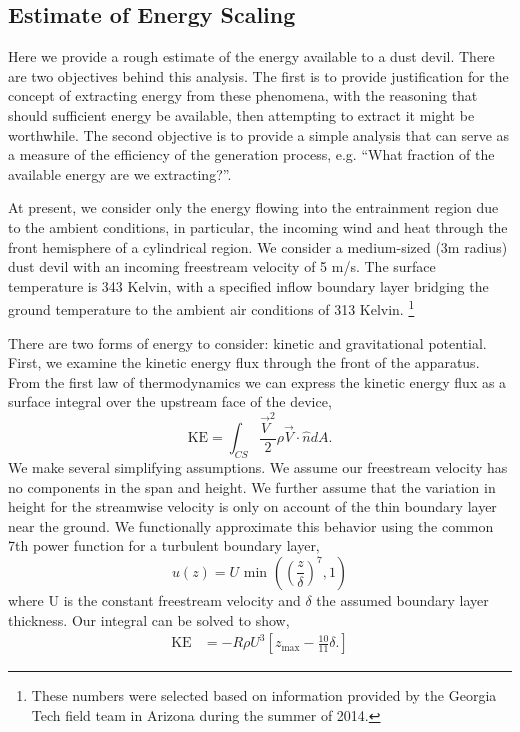 \subsection{Estimate of Energy Scaling}

Here we provide a rough estimate of the energy
available to a dust devil. There are two objectives behind this
analysis. The first is to provide justification for the concept of
extracting energy from these phenomena, with the reasoning that should
sufficient energy be available, then attempting to extract it might be
worthwhile. The second objective is to provide a simple analysis that
can serve as a measure of the efficiency of the generation process,
e.g. ``What fraction of the available energy are we extracting?''.  

At present, we consider only the energy flowing into the entrainment
region due to the ambient conditions, in particular, the incoming wind
and heat through the front hemisphere of a cylindrical region. We
consider a medium-sized (3m radius) dust devil with an incoming
freestream velocity of 5 m/s. The surface temperature is 343 Kelvin,
with a specified inflow boundary layer bridging the ground temperature
to the ambient air conditions of 313 Kelvin. 
\footnote{\normalsize These numbers were selected based on information
provided by the Georgia Tech field team in Arizona during the summer of
2014.} 

There are two forms of energy to consider: kinetic and gravitational
potential. First, we examine the kinetic energy flux through the front
of the apparatus. From the first law of thermodynamics we can express
the kinetic energy flux as a surface integral over the upstream face of
the device,  
\begin{equation*}
\text{KE} = \int_{CS} \frac{\vec V^2}{2} \rho \vec V \cdot \hat n dA.
\end{equation*}
%
%
We make several simplifying assumptions. We assume our freestream 
velocity has no components in the span and height. 
We further assume that the variation in height for the streamwise
velocity is only on account of the thin boundary layer near the
ground. We functionally approximate this behavior using the common 7th
power function for a turbulent boundary layer,  
\begin{equation*}
  u(z) = U \text{ min }\left(\left(\frac{z}{\delta}\right)^7,1\right)
\end{equation*}
where U is the constant freestream velocity and $\delta$ the assumed
boundary layer thickness. Our integral can be solved to show, 
\begin{align*}
\text{KE} & = -R \rho U^3 \left[ z_{\text{max}} - \frac{10}{11}\delta.
\right]
\end{align*}

